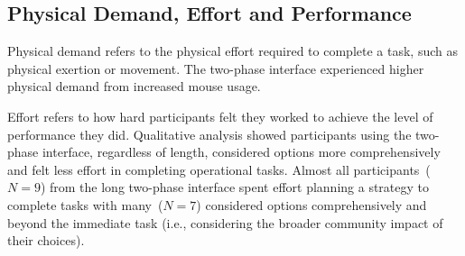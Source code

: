 




\subsection{Physical Demand, Effort and Performance}
Physical demand refers to the physical effort required to complete a task, such as physical exertion or movement. The two-phase interface experienced higher physical demand from increased mouse usage.

Effort refers to how hard participants felt they worked to achieve the level of performance they did. Qualitative analysis showed participants using the two-phase interface, regardless of length, considered options more comprehensively and felt less effort in completing operational tasks. Almost all participants~($N=9$) from the long two-phase interface spent effort planning a strategy to complete tasks with many~($N=7$) considered options comprehensively and beyond the immediate task (i.e., considering the broader community impact of their choices). 

